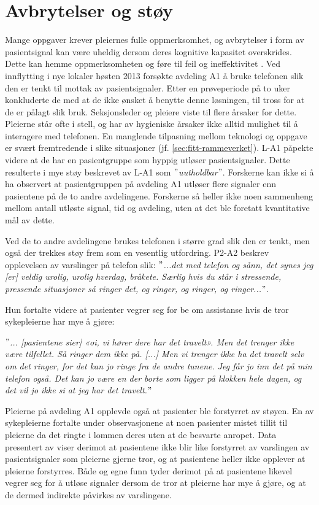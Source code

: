 \section{Avbrytelser og støy}
Mange oppgaver krever pleiernes fulle oppmerksomhet, og avbrytelser i form av pasientsignal kan være uheldig dersom deres kognitive kapasitet overskrides. Dette kan hemme oppmerksomheten og føre til feil og ineffektivitet \citep{Ebright10, Parker00}.
Ved innflytting i nye lokaler høsten 2013 forsøkte avdeling A1 å bruke telefonen slik den er tenkt til mottak av pasientsignaler. Etter en prøveperiode på to uker konkluderte de med at de ikke ønsket å benytte denne løsningen, til tross for at de er pålagt slik bruk. Seksjonsleder og pleiere viste til flere årsaker for dette. Pleierne står ofte i stell, og har av hygieniske årsaker ikke alltid mulighet til å interagere med telefonen. En manglende tilpasning mellom teknologi og oppgave er svært fremtredende i slike situasjoner (jf. \ref{sec:fitt-rammeverket}). L-A1 påpekte videre at de har en pasientgruppe som hyppig utløser pasientsignaler. Dette resulterte i mye støy beskrevet av L-A1 som \textit{$"$uutholdbar$"$}. Forskerne kan ikke si å ha observert at pasientgruppen på avdeling A1 utløser flere signaler enn pasientene på de to andre avdelingene. Forskerne så heller ikke noen sammenheng mellom antall utløste signal, tid og avdeling, uten at det ble foretatt kvantitative mål av dette.

\noindent
Ved de to andre avdelingene brukes telefonen i større grad slik den er tenkt, men også der trekkes støy frem som en vesentlig utfordring. P2-A2 beskrev opplevelsen av varslinger på telefon slik: \textit{ $"$...det med telefon og sånn, det synes jeg [er] veldig urolig, urolig hverdag, bråkete. Særlig hvis du står i stressende, pressende situasjoner så ringer det, og ringer, og ringer, og ringer...$"$}. 

\noindent
Hun fortalte videre at pasienter vegrer seg for be om assistanse hvis de tror sykepleierne har mye å gjøre:

\noindent
\textit{$"$... [pasientene sier] «oi, vi hører dere har det travelt». Men det trenger ikke være tilfellet. Så ringer dem ikke på. [...] Men vi trenger ikke ha det travelt selv om det ringer, for det kan jo ringe fra de andre tunene. Jeg får jo inn det på min telefon også. Det kan jo være en der borte som ligger på klokken hele dagen, og det vil jo ikke si at jeg har det travelt.$"$}

\noindent
Pleierne på avdeling A1 opplevde også at pasienter ble forstyrret av støyen. En av sykepleierne fortalte under observasjonene at noen pasienter mistet tillit til pleierne da det ringte i lommen deres uten at de besvarte anropet. Data presentert av \citet{Rygh13} viser derimot at pasientene ikke blir like forstyrret av varslingen av pasientsignaler som pleierne gjerne tror, og at pasientene heller ikke opplever at pleierne forstyrres. Både \citet{Rygh13} og egne funn tyder derimot på at pasientene likevel vegrer seg for å utløse signaler dersom de tror at pleierne har mye å gjøre, og at de dermed indirekte påvirkes av varslingene.

